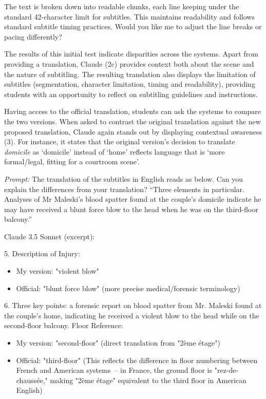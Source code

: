 \documentclass[output=paper]{langscibook}
\begin{document}
{The text is broken down into readable chunks, each line keeping under the standard 42-character limit for subtitles. This maintains readability and follows standard subtitle timing practices. Would you like me to adjust the line breaks or pacing differently?}
\z
\z


The results of this initial test indicate disparities across the systems. Apart from providing a translation, Claude (2c) provides context both about the scene and the nature of subtitling. The resulting translation also displays the limitation of subtitles (segmentation, character limitation, timing and readability), providing students with an opportunity to reflect on subtitling guidelines and instructions.

Having access to the official translation, students can ask the systems to compare the two versions. When asked to contrast the original translation against the new proposed translation, Claude again stands out by displaying contextual awareness (3). For instance, it states that the original version’s decision to translate \textit{domicile} as ‘domicile’ instead of ‘home’ reflects language that is ‘more formal/legal, fitting for a courtroom scene’.

\ea \textit{Prompt:} The translation of the subtitles in English reads as below. Can you explain the differences from your translation? “Three elements in particular. Analyses of Mr Maleski’s blood spatter found at the couple’s domicile indicate he may have received a blunt force blow to the head when he was on the third-floor balcony.”

\ea Claude 3.5 Sonnet (excerpt):
\ttfamily

 {5. Description of Injury:}

\begin{itemize}
\item  {My version: "violent blow"}
\item  {Official: "blunt force blow" (more precise medical/forensic terminology)}
\end{itemize}

{6. Three key points: a forensic report on blood spatter from Mr. Maleski found at the couple's home, indicating he received a violent blow to the head while on the second-floor balcony. Floor Reference:}

\begin{itemize}
\item  {My version: "second-floor" (direct translation from "2ème étage")}
\item  {Official: "third-floor" (This reflects the difference in floor numbering between French and American systems~-- in France, the ground floor is "rez-de-chaussée," making "2ème étage" equivalent to the third floor in American English)}
\end{itemize}
\end{document}

